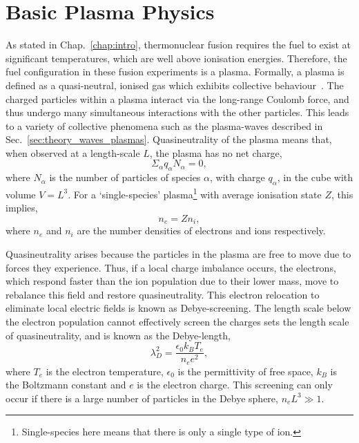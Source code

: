 \section{Basic Plasma Physics}%
\label{sec:theory_plasma_phys}

As stated in Chap.~\ref{chap:intro}, thermonuclear fusion requires the fuel to exist at significant temperatures, which are well above ionisation energies.
Therefore, the fuel configuration in these fusion experiments is a plasma.
Formally, a plasma is defined as a quasi-neutral, ionised gas which exhibits collective behaviour~\cite{chen_introduction_2018}.
The charged particles within a plasma interact via the long-range Coulomb force, and thus undergo many simultaneous interactions with the other particles.
This leads to a variety of collective phenomena such as the plasma-waves described in Sec.~\ref{sec:theory_waves_plasmas}.
Quasineutrality of the plasma means that, when observed at a length-scale $L$, the plasma has no net charge,
\begin{equation}
    \Sigma_{\alpha}q_{\alpha}N_{\alpha} = 0,
\end{equation}
where $N_{\alpha}$ is the number of particles of species $\alpha$, with charge $q_{\alpha}$, in the cube with volume $V=L^3$.
For a `single-species' plasma\footnote{Single-species here means that there is only a single type of ion.} with average ionisation state $Z$, this implies,
\begin{equation}
    n_e = Z n_i,
\end{equation}
where $n_e$ and $n_i$ are the number densities of electrons and ions respectively.

Quasineutrality arises because the particles in the plasma are free to move due to forces they experience.
Thus, if a local charge imbalance occurs, the electrons, which respond faster than the ion population due to their lower mass, move to rebalance this field and restore quasineutrality.
This electron relocation to eliminate local electric fields is known as Debye-screening.
The length scale below the electron population cannot effectively screen the charges sets the length scale of quasineutrality, and is known as the Debye-length,
\begin{equation}
    \lambda_{D}^2 = \frac{\epsilon_0 k_B T_e}{n_e e^2},
\end{equation}
where $T_e$ is the electron temperature, $\epsilon_0$ is the permittivity of free space, $k_B$ is the Boltzmann constant and $e$ is the electron charge.
This screening can only occur if there is a large number of particles in the Debye sphere, $n_e L^3\gg 1$.

